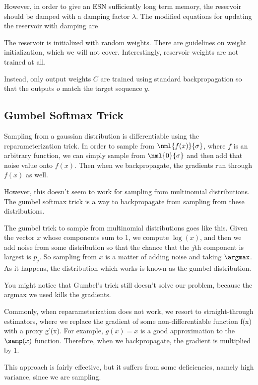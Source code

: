 \documentclass[12pt]{article}
\begin{document}
However, in order to give an ESN sufficiently long term memory, the reservoir should be damped with a damping factor $\lambda$. The modified equations for updating the reservoir with damping are


The reservoir is initialized with random weights. There are guidelines on weight initialization, which we will not cover. Interestingly, reservoir weights are not trained at all.

Instead, only output weights $C$ are trained using standard backpropagation so that the outputs $o$ match the target sequence $y$. 

\subsection{Gumbel Softmax Trick}

Sampling from a gaussian distribution is differentiable using the reparameterization trick. In order to sample from $\nml{f(x)}{\sigma}$, where $f$ is an arbitrary function, we can simply sample from $\nml{0}{\sigma}$ and then add that noise value onto $f(x)$. Then when we backpropagate, the gradients run through $f(x)$ as well.

However, this doesn't seem to work for sampling from multinomial distributions. The gumbel softmax trick is a way to backpropagate from sampling from these distributions. 

The gumbel trick to sample from multinomial distributions goes like this. Given the vector $x$ whose components sum to 1, we compute $\log(x)$, and then we add noise from some distribution so that the chance that the $j$th component is largest is $p_j$. So sampling from $x$ is a matter of adding noise and taking $\argmax$. As it happens, the distribution which works is known as the gumbel distribution.

You might notice that Gumbel's trick still doesn't solve our problem, because the argmax we used kills the gradients. 

Commonly, when reparameterization does not work, we resort to straight-through estimators, where we replace the gradient of some non-differentiable function f(x) with a proxy g'(x). For example, $g(x) = x$ is a good approximation to the $\samp(x)$ function. Therefore, when we backpropagate, the gradient is multiplied by 1.

This approach is fairly effective, but it suffers from some deficiencies, namely high variance, since we are sampling.
\end{document}
